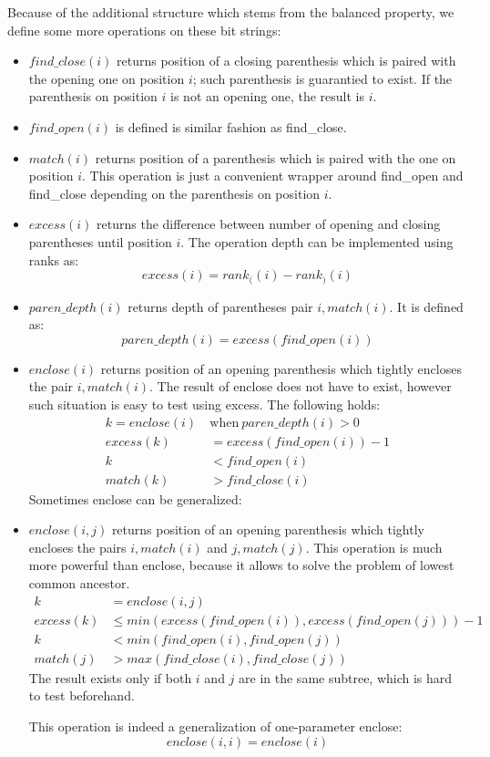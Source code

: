 Because of the additional structure which stems from the balanced property, we define some more operations on these bit strings:
\begin{itemize}
	\item \emph{$find\_close(i)$} returns position of a closing parenthesis which is paired with the opening one on position $i$; such parenthesis is guarantied to exist.
	If the parenthesis on position $i$ is not an opening one, the result is $i$.
	\item \emph{$find\_open(i)$} is defined is similar fashion as find\_close.
	\item \emph{$match(i)$} returns position of a parenthesis which is paired with the one on position $i$.
	This operation is just a convenient wrapper around find\_open and find\_close depending on the parenthesis on position $i$.
	\item \emph{$excess(i)$} returns the difference between number of opening and closing parentheses until position $i$.
	The operation depth can be implemented using ranks as: $$excess(i) = rank_((i) - rank_)(i)$$
	\item \emph{$paren\_depth(i)$} returns depth of parentheses pair $i, match(i)$.
	It is defined as: $$paren\_depth(i) = excess(find\_open(i))$$
	\item \emph{$enclose(i)$} returns position of an opening parenthesis which tightly encloses the pair $i, match(i)$.
	The result of enclose does not have to exist, however such situation is easy to test using excess.
	The following holds:
	\begin{align*}
		k = enclose(i)\ &\textrm{when}\ paren\_depth(i) > 0\\
		excess(k) &= excess(find\_open(i)) - 1 \\
		k &< find\_open(i) \\
		match(k) &> find\_close(i)
	\end{align*}
	Sometimes enclose can be generalized:
	\item \emph{$enclose(i, j)$} returns position of an opening parenthesis which tightly encloses the pairs $i, match(i)$ and $j, match(j)$.
	This operation is much more powerful than enclose, because it allows to solve the problem of lowest common ancestor.
	\begin{align*}
	k &= enclose(i, j)\\
	excess(k) &\le min(excess(find\_open(i)), excess(find\_open(j))) - 1 \\
	k &< min(find\_open(i), find\_open(j)) \\
	match(j) &> max(find\_close(i), find\_close(j))
	\end{align*}
	The result exists only if both $i$ and $j$ are in the same subtree, which is hard to test beforehand.
	
	This operation is indeed a generalization of one-parameter enclose:
	$$enclose(i, i) = enclose(i)$$
\end{itemize}

